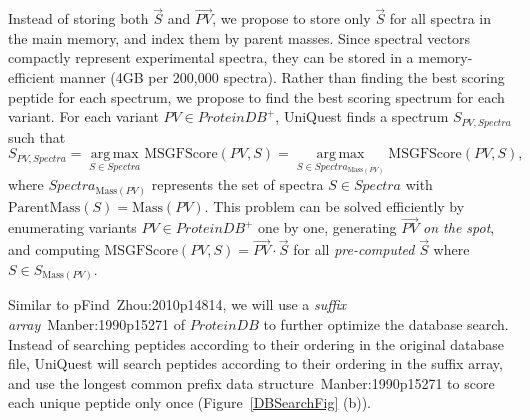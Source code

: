 Instead of storing both $\vec{S}$ and $\vec{PV}$, we propose to store only $\vec{S}$ for all spectra in the main memory, and 
index them by parent masses. 
Since spectral vectors compactly represent experimental spectra, they can be stored in a memory-efficient manner (4GB per 200,000 spectra). 
Rather than finding the best scoring peptide for each spectrum, we propose to find the best scoring spectrum for each variant.
%
For each variant $PV \in ProteinDB^+$, UniQuest finds a spectrum $S_{PV,Spectra}$ such that
\begin{equation}
\label{DBSearchProblem}S_{PV,Spectra} = \operatorname*{arg\,max}_{S \in Spectra} \textrm{MSGFScore}(PV,S)
= \operatorname*{arg\,max}_{S \in Spectra_{\textrm{Mass}(PV)}} \textrm{MSGFScore}(PV,S),
\end{equation}
where $Spectra_{\textrm{Mass}(PV)}$ represents the set of spectra $S \in Spectra$ with $\textrm{ParentMass}(S) = \textrm{Mass}(PV)$.
This problem can be solved efficiently by enumerating variants $PV \in ProteinDB^+$ one by one, generating $\vec{PV}$ {\em on the spot},
and computing $\textrm{MSGFScore}(PV,S)=\vec{PV} \cdot \vec{S}$ for all {\em pre-computed} $\vec{S}$ where $S \in S_{\textrm{Mass}(PV)}$.


Similar to pFind~\cite{unv}{Zhou:2010p14814}, we will use a {\em suffix array}~\cite{unv}{Manber:1990p15271} of $ProteinDB$
to further optimize the database search. 
%
%
Instead of
searching peptides according to their ordering in the original database
file, UniQuest will search peptides according to their ordering in the
suffix array, and use the longest common prefix data structure~\cite{unv}{Manber:1990p15271}
to score each unique peptide only once (Figure~\ref{DBSearchFig} (b)). 


